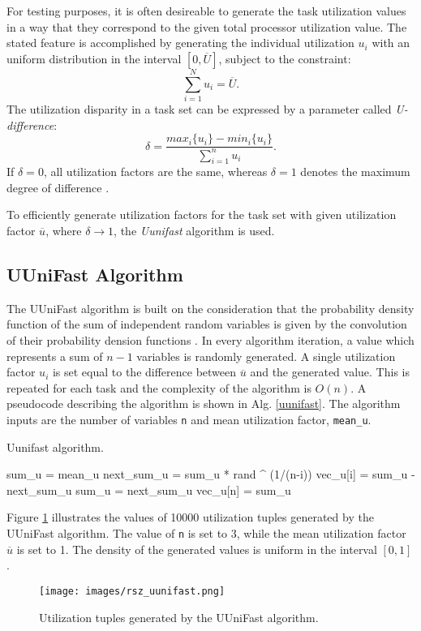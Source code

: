 For testing purposes, it is often desireable to generate the task utilization values in a way that they correspond to the given total processor utilization value.
The stated feature is accomplished by generating the individual utilization $u_i$ with an uniform distribution in the interval $[0, \overline{U}]$, subject to the constraint:
\begin{equation*}
\sum_{i=1}^{N}u_i = \overline{U}.
\end{equation*}
The utilization disparity in a task set can be expressed by a parameter called \textit{U-difference}:
\begin{equation*}
\delta = \frac{max_i\{u_i\}-min_i\{u_i\}}{\sum_{i=1}^{n}u_i}.
\end{equation*}
If $\delta = 0$, all utilization factors are the same, whereas $\delta=1$ denotes the maximum degree of difference \cite{bini2005measuring}.

To efficiently generate utilization factors for the task set with given utilization factor $\overline{u}$, where $\delta \rightarrow 1$, the \textit{Uunifast} algorithm is used.

\subsection{UUniFast Algorithm}
The UUniFast algorithm is built on the consideration that the probability density function of the sum of independent random variables is given by the convolution of their probability dension functions \cite{bini2005measuring}.
In every algorithm iteration, a value which represents a sum of $n-1$ variables is randomly generated.
A single utilization factor $u_i$ is set equal to the difference between $\overline{u}$ and the generated value.
This is repeated for each task and the complexity of the algorithm is $O(n)$.
A pseudocode describing the algorithm is shown in Alg. \ref{uunifast}.
The algorithm inputs are the number of variables \texttt{n} and mean utilization factor, \texttt{mean\_u}.
\begin{algorithm}
\caption{Uunifast algorithm.\label{uunifast}}
\begin{algorithmic}[1]
\State sum\_u = mean\_u
\State next\_sum\_u = sum\_u * rand \^{} (1/(n-i))
\State vec\_u[i] = sum\_u - next\_sum\_u
\State sum\_u = next\_sum\_u
\EndFor
\State vec\_u[n] = sum\_u
\end{algorithmic}
\end{algorithm}
Figure \ref{uunifast:fig} illustrates the values of 10000 utilization tuples generated by the UUniFast algorithm.
The value of \texttt{n} is set to 3, while the mean utilization factor $\overline{u}$ is set to 1.
The density of the generated values is uniform in the interval $[0, 1]$.
\begin{figure}[ht]
    \centering
    \texttt{[image: images/rsz\_uunifast.png]}
    \caption{Utilization tuples generated by the UUniFast algorithm.}
    \label{uunifast:fig}
\end{figure}

